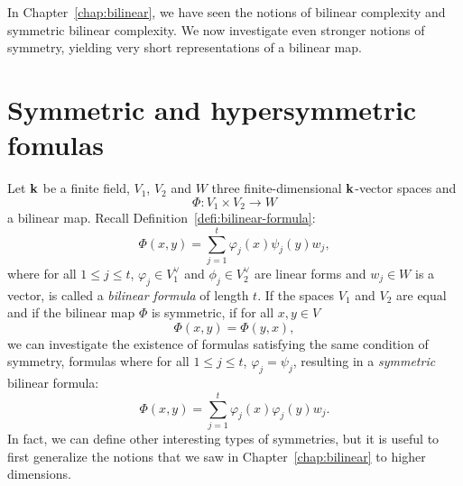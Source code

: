 In Chapter~\ref{chap:bilinear}, we have seen the notions of bilinear complexity
and symmetric bilinear complexity. We now investigate even stronger
notions of symmetry, yielding very short representations of a bilinear
map.

\minitoc

%
%
%

\clearpage
\section{Symmetric and hypersymmetric fomulas}
\label{sec:sym-and-hypersym}
%
%
%

Let $\mathbf{k}$ be a finite field, $V_1$, $V_2$ and $W$ three finite-dimensional $\mathbf{k}$-vector
spaces and
\[
  \Phi:V_1\times V_2\to W
\]
a bilinear map. Recall Definition~\ref{defi:bilinear-formula}:
\[
  \Phi(x, y) = \sum_{j=1}^t\varphi_j(x)\psi_j(y)w_j,
\]
where for all $1\leq j\leq t$, $\varphi_j\in V_1^\vee$ and $\phi_j\in V_2^\vee$ are linear forms and
$w_j\in W$ is a vector, is called a \emph{bilinear formula} of length $t$. If
the spaces $V_1$ and $V_2$ are equal and if the bilinear map $\Phi$ is
symmetric, \ie if for all $x, y\in V$
\[
  \Phi(x, y) = \Phi(y, x),
\]
we can investigate the existence of formulas satisfying the same condition of
symmetry, \ie formulas where for all $1\leq j\leq t$, $\varphi_j=\psi_j$,
resulting in a \emph{symmetric} bilinear formula:
\[
  \Phi(x, y) = \sum_{j=1}^t\varphi_j(x)\varphi_j(y)w_j.
\]
In fact, we can define other interesting types of symmetries, but it is useful
to first generalize the notions that we saw in Chapter~\ref{chap:bilinear} to
higher dimensions.

